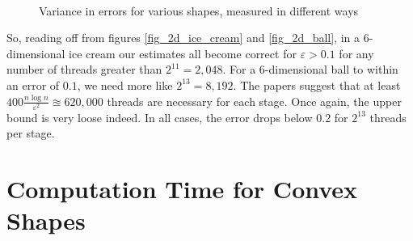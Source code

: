 \begin{figure}
\centering
{}
\\

\label{fig_histograms}
\caption{Variance in errors for various shapes, measured in different ways}
\end{figure}


So, reading off from figures \ref{fig_2d_ice_cream} and \ref{fig_2d_ball}, in a 6-dimensional ice cream our estimates all become correct for $\varepsilon > 0.1$ for any number of threads greater than $2^11 = 2,048$. For a 6-dimensional ball to within an error of $0.1$, we need more like $2^13 = 8,192$. The papers suggest that at least $400\frac{n\log n}{\varepsilon^2} \approxeq 620,000$ threads are necessary for each stage. Once again, the upper bound is very loose indeed. In all cases, the error drops below $0.2$ for $2^{13}$ threads per stage.

\section{Computation Time for Convex Shapes}\label{sec_time}

